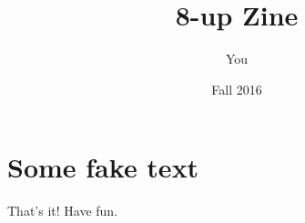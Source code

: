 \documentclass[statementpaper,oneside,article,14pt]{memoir}
\newcommand{\BackgroundPic}[1]{%
\put(0,0){%
\parbox[b][\paperheight]{\paperwidth}{%
\vfill
\centering
{\transparent{0.4} \texttt{[image: \#1]}}%
\vfill
}}}
\begin{document}

\title{8-up Zine}
\author{You}
\date{Fall 2016}

\begingroup
\let\cleardoublepage\clearpage


\begin{titlingpage}
\maketitle


\end{titlingpage}

\endgroup

\pagestyle{empty}




\section{Some fake text}

\kant[1-6]



\newpage

\Large That's it! Have fun.
\end{document}

